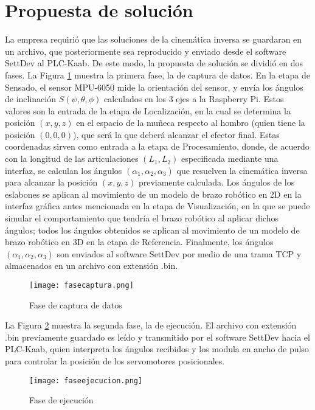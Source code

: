 \section{Propuesta de solución}

La empresa requirió que las soluciones de la cinemática inversa se guardaran en un archivo, que posteriormente sea reproducido y enviado desde el software SettDev al PLC-Kaab. De este modo, la propuesta de solución se dividió en dos fases. La Figura \ref{fig:fasecaptura} muestra la primera fase, la de captura de datos. En la etapa de Sensado, el sensor MPU-6050 mide la orientación del sensor, y envía los ángulos de inclinación $S(\psi, \theta, \phi)$ calculados en los 3 ejes a la Raspberry Pi. Estos valores son la entrada de la etapa de Localización, en la cual se determina la posición $(x, y, z)$ en el espacio de la muñeca respecto al hombro (quien tiene la posición $(0, 0, 0)$), que será la que deberá alcanzar el efector final. Estas coordenadas sirven como entrada a la etapa de Procesamiento, donde, de acuerdo con la longitud de las articulaciones $(L_1, L_2)$ especificada mediante una interfaz, se calculan los ángulos $(\alpha_1, \alpha_2, \alpha_3)$ que resuelven la cinemática inversa para alcanzar la posición $(x, y, z)$ previamente calculada. Los ángulos de los eslabones se aplican al movimiento de un modelo de brazo robótico en 2D en la interfaz gráfica antes mencionada en la etapa de Visualización, en la que se puede simular el comportamiento que tendría el brazo robótico al aplicar dichos ángulos; todos los ángulos obtenidos se aplican al movimiento de un modelo de brazo robótico en 3D en la etapa de Referencia. Finalmente, los ángulos $(\alpha_1, \alpha_2, \alpha_3)$ son enviados al software SettDev por medio de una trama TCP y almacenados en un archivo con extensión .bin.

\begin{figure}[htb]
	\centering
	\texttt{[image: fasecaptura.png]}
	\caption{Fase de captura de datos}
	\label{fig:fasecaptura}
\end{figure}

\newpage
La Figura \ref{fig:faseejecucion} muestra la segunda fase, la de ejecución. El archivo con extensión .bin previamente guardado es leído y transmitido por el software SettDev hacia el PLC-Kaab, quien interpreta los ángulos recibidos y los modula en ancho de pulso para controlar la posición de los servomotores posicionales.

\begin{figure}[htb]
	\centering
	\texttt{[image: faseejecucion.png]}
	\caption{Fase de ejecución}
	\label{fig:faseejecucion}
\end{figure}